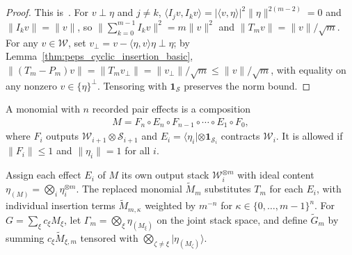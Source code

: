 \begin{proof}\leanok
    This is~\cite[``One-effect estimate'']{QICLean2026Blueprint}.
    For $v\perp\eta$ and $j\neq k$, $\langle I_jv,I_kv\rangle=|\langle v,\eta\rangle|^2\|\eta\|^{2(m-2)}=0$
    and $\|I_kv\|=\|v\|$, so $\|\sum_{k=0}^{m-1}I_kv\|^2=m\|v\|^2$ and
    $\|T_mv\|=\|v\|/\sqrt m$. For any $v\in\mathcal W$, set
    $v_\perp=v-\langle\eta,v\rangle\eta\perp\eta$; by
    Lemma~\ref{thm:peps_cyclic_insertion_basic},
    $\|(T_m-P_m)v\|=\|T_mv_\perp\|=\|v_\perp\|/\sqrt m\le\|v\|/\sqrt m$, with
    equality on any nonzero $v\in\{\eta\}^\perp$. Tensoring with
    $\mathbf 1_{\mathcal S}$ preserves the norm bound.
\end{proof}

\begin{definition}
    \label{def:peps_effect_chain}
    \leanok
    A monomial with $n$ recorded pair effects is a composition
    \begin{align}
        M=F_n\circ E_n\circ F_{n-1}\circ\cdots\circ E_1\circ F_0,
        \label{eq:peps_effect_chain}
    \end{align}
    where $F_i$ outputs $\mathcal W_{i+1}\otimes\mathcal S_{i+1}$ and
    $E_i=\langle\eta_i|\otimes\mathbf 1_{\mathcal S_i}$ contracts $\mathcal W_i$.
    It is allowed if $\|F_i\|\le 1$ and $\|\eta_i\|=1$ for all $i$.
\end{definition}

\begin{definition}
    \label{def:peps_replaced_gate}
    \leanok
    Assign each effect $E_i$ of $M$ its own output stack $\mathcal W_i^{\otimes m}$
    with ideal content $\eta_{(M)}=\bigotimes_i\eta_i^{\otimes m}$. The
    replaced monomial $\widetilde M_m$ substitutes $T_m$ for each $E_i$, with
    individual insertion terms $\widetilde M_{m,\kappa}$ weighted by $m^{-n}$
    for $\kappa\in\{0,\dots,m-1\}^n$. For $G=\sum_\xi c_\xi M_\xi$, let
    $\Gamma_m=\bigotimes_\xi\eta_{(M_\xi)}$ on the joint stack space, and define
    $\widetilde G_m$ by summing $c_\xi\widetilde M_{\xi,m}$ tensored with
    $\bigotimes_{\zeta\neq\xi}|\eta_{(M_\zeta)}\rangle$.
\end{definition}

